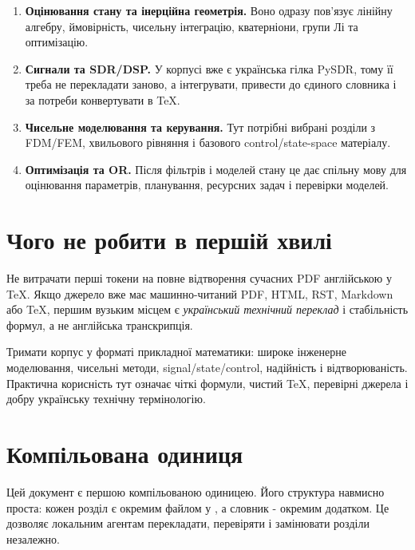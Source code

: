 \begin{enumerate}[label=\arabic*.]
  \item \textbf{Оцінювання стану та інерційна геометрія.} Воно одразу пов'язує лінійну алгебру, ймовірність, чисельну інтеграцію, кватерніони, групи Лі та оптимізацію.
  \item \textbf{Сигнали та SDR/DSP.} У корпусі вже є українська гілка PySDR, тому її треба не перекладати заново, а інтегрувати, привести до єдиного словника і за потреби конвертувати в TeX.
  \item \textbf{Чисельне моделювання та керування.} Тут потрібні вибрані розділи з FDM/FEM, хвильового рівняння і базового control/state-space матеріалу.
  \item \textbf{Оптимізація та OR.} Після фільтрів і моделей стану це дає спільну мову для оцінювання параметрів, планування, ресурсних задач і перевірки моделей.
\end{enumerate}

\section{Чого не робити в першій хвилі}

Не витрачати перші токени на повне відтворення сучасних PDF англійською у TeX. Якщо джерело вже має машинно-читаний PDF, HTML, RST, Markdown або TeX, першим вузьким місцем є \emph{український технічний переклад} і стабільність формул, а не англійська транскрипція.

Тримати корпус у форматі прикладної математики: широке інженерне моделювання, чисельні методи, signal/state/control, надійність і відтворюваність. Практична корисність тут означає чіткі формули, чистий TeX, перевірні джерела і добру українську технічну термінологію.

\section{Компільована одиниця}

Цей документ є першою компільованою одиницею. Його структура навмисно проста: кожен розділ є окремим файлом у , а словник - окремим додатком. Це дозволяє локальним агентам перекладати, перевіряти і замінювати розділи незалежно.

